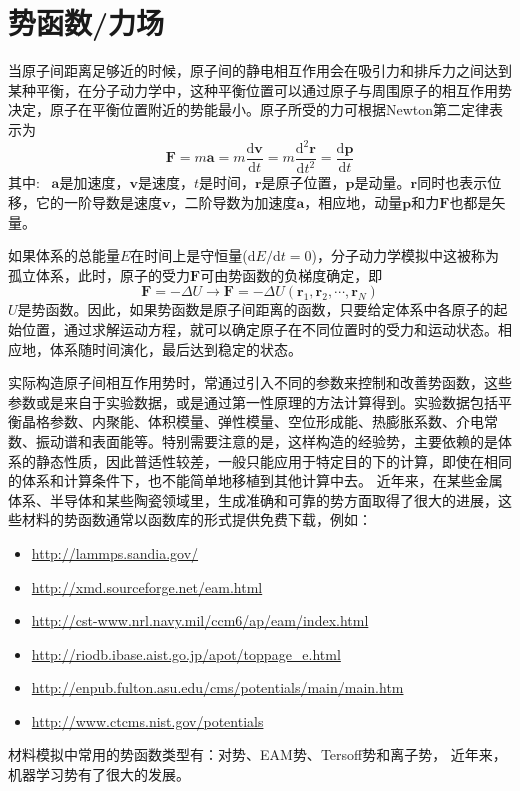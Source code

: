 \section{势函数/力场}
当原子间距离足够近的时候，原子间的静电相互作用会在吸引力和排斥力之间达到某种平衡，在分子动力学中，这种平衡位置可以通过原子与周围原子的相互作用势决定，原子在平衡位置附近的势能最小。原子所受的力可根据\textrm{Newton}第二定律表示为
\begin{equation}
	\mathbf{F}=m\mathbf{a}=m\dfrac{\mathrm{d}\mathbf{v}}{\mathrm{d}t}=m\dfrac{\mathrm{d}^2\mathbf{r}}{\mathrm{d}t^2}=\dfrac{\mathrm{d}\mathbf{p}}{\mathrm{d}t}
	\label{eq:Newton_2}
\end{equation}
其中:~
$\mathbf{a}$是加速度，$\mathbf{v}$是速度，$t$是时间，$\mathbf{r}$是原子位置，$\mathbf{p}$是动量。$\mathbf{r}$同时也表示位移，它的一阶导数是速度$\mathbf{v}$，二阶导数为加速度$\mathbf{a}$，相应地，动量$\mathbf{p}$和力$\mathbf{F}$也都是矢量。

如果体系的总能量$E$在时间上是守恒量($\mathrm{d}E/\mathrm{d}t=0$)，分子动力学模拟中这被称为孤立体系，此时，原子的受力$\mathbf{F}$可由势函数的负梯度确定，即
\begin{equation}
	\mathbf{F}=-\Delta U\rightarrow\mathbf{F}=-\Delta U(\mathbf{r}_1,\mathbf{r}_2,\cdots,\mathbf{r}_N)
	\label{eq:Force_Potential}
\end{equation}
$U$是势函数。因此，如果势函数是原子间距离的函数，只要给定体系中各原子的起始位置，通过求解运动方程，就可以确定原子在不同位置时的受力和运动状态。相应地，体系随时间演化，最后达到稳定的状态。

实际构造原子间相互作用势时，常通过引入不同的参数来控制和改善势函数，这些参数或是来自于实验数据，或是通过第一性原理的方法计算得到。实验数据包括平衡晶格参数、内聚能、体积模量、弹性模量、空位形成能、热膨胀系数、介电常数、振动谱和表面能等。特别需要注意的是，这样构造的经验势，主要依赖的是体系的静态性质，因此普适性较差，一般只能应用于特定目的下的计算，即使在相同的体系和计算条件下，也不能简单地移植到其他计算中去。%
近年来，在某些金属体系、半导体和某些陶瓷领域里，生成准确和可靠的势方面取得了很大的进展，这些材料的势函数通常以函数库的形式提供免费下载，例如：
\begin{itemize}
	\item \url{http://lammps.sandia.gov/}
	\item \url{http://xmd.sourceforge.net/eam.html}
	\item \url{http://cst-www.nrl.navy.mil/ccm6/ap/eam/index.html}
	\item \url{http://riodb.ibase.aist.go.jp/apot/toppage_e.html}
	\item \url{http://enpub.fulton.asu.edu/cms/potentials/main/main.htm}
	\item \url{http://www.ctcms.nist.gov/potentials}
\end{itemize}
材料模拟中常用的势函数类型有：对势、\textrm{EAM}势、\textrm{Tersoff}势和离子势，%
近年来，机器学习势有了很大的发展。
